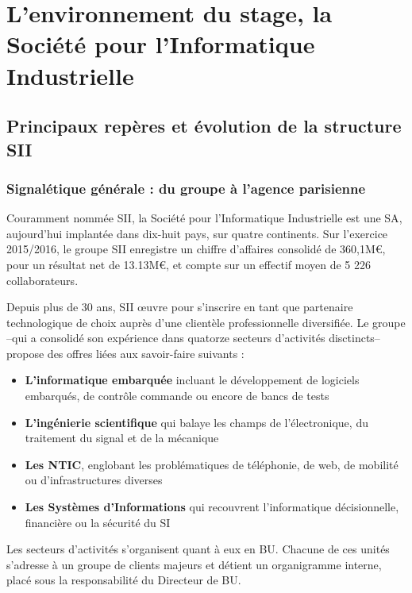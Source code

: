 \chapter{L'environnement du stage, la Société pour l'Informatique Industrielle}

\section{Principaux repères et évolution de la structure SII}

\subsection{Signalétique générale : du groupe à l'agence parisienne}

Couramment nommée \gls{SII}, la Société pour l'Informatique Industrielle est une \gls{SA}, aujourd'hui implantée dans dix-huit pays, sur quatre continents.
Sur l'exercice 2015/2016, le groupe SII enregistre un chiffre d'affaires consolidé de 360,1M\euro\cite{Bib_exercice_2015_2016}, pour un résultat net de 13.13M\euro\cite{Bib_exercice_2015_2016}, et compte sur un effectif moyen de 5 226 collaborateurs\cite{Bib_exercice_2015_2016}. 

Depuis plus de 30 ans\cite{Bib_exercice_2015_2016}\cite{Bib_memento_ag_idf}, SII \oe{}uvre pour s'inscrire en tant que partenaire technologique de choix auprès d'une clientèle professionnelle diversifiée. 
Le groupe --qui a consolidé son expérience dans quatorze secteurs d'activités disctincts-- propose des offres liées aux savoir-faire suivants : 

\begin{itemize}
 \item \textbf{L'informatique embarquée} incluant le développement de logiciels embarqués, de contrôle commande ou encore de bancs de tests   
 \item \textbf{L'ingénierie scientifique} qui balaye les champs de l'électronique, du traitement du signal et de la mécanique
 \item \textbf{Les \gls{NTIC}}, englobant les problématiques de téléphonie, de web, de mobilité ou d'infrastructures diverses
 \item \textbf{Les Systèmes d'Informations} qui recouvrent l'informatique décisionnelle, financière ou la sécurité du \gls{SI}
\end{itemize}

Les secteurs d'activités s'organisent quant à eux en \gls{BU}. Chacune de ces unités s'adresse à un groupe de clients majeurs et détient un organigramme interne, placé sous la responsabilité du Directeur de \gls{BU}. 

